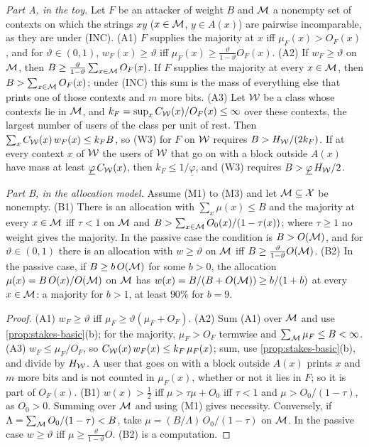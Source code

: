 \begin{theorem}\label{thm:lump}
\emph{Part A, in the toy.} Let $F$ be an attacker of weight $B$ and $\mathcal M$ a nonempty set of contexts on which
the strings $xy$ ($x\in\mathcal M$, $y\in A(x)$) are pairwise incomparable, as they are under (INC). \textup{(A1)}
$F$ supplies the majority at $x$ iff $\mu_F(x)>O_F(x)$, and for $\vartheta\in(0,1)$, $w_F(x)\ge\vartheta$ iff
$\mu_F(x)\ge\frac{\vartheta}{1-\vartheta}O_F(x)$. \textup{(A2)} If $w_F\ge\vartheta$ on $\mathcal M$, then
$B\ge\frac{\vartheta}{1-\vartheta}\sum_{x\in\mathcal M}O_F(x)$. If $F$ supplies the majority at every $x\in\mathcal M$, then
$B>\sum_{x\in\mathcal M}O_F(x)$; under (INC) this sum is the mass of everything else that prints one of those
contexts and $m$ more bits. \textup{(A3)} Let $\mathcal W$ be a class whose contexts lie in $\mathcal M$, and
$k_F=\sup_xC_{\mathcal W}(x)/O_F(x)\le\infty$ over these contexts, the largest number of users of the class per unit
of rest. Then $\sum_xC_{\mathcal W}(x)\,w_F(x)\le k_FB$, so (W3) for $F$ on $\mathcal W$ requires $B>H_{\mathcal W}/(2k_F)$. If at
every context $x$ of $\mathcal W$ the users of $\mathcal W$ that go on with a block outside $A(x)$ have mass at least
$\underline\varphi\,C_{\mathcal W}(x)$, then $k_F\le1/\underline\varphi$, and (W3) requires
$B>\underline\varphi\,H_{\mathcal W}/2$.

\emph{Part B, in the allocation model.} Assume (M1) to (M3) and let $\mathcal M\subseteq\mathcal X$ be nonempty.
\textup{(B1)} There is an allocation with $\sum_x\mu(x)\le B$ and the majority at every $x\in\mathcal M$ iff
$\tau<1$ on $\mathcal M$ and $B>\sum_{x\in\mathcal M}O_0(x)/(1-\tau(x))$; where $\tau\ge1$ no weight gives the majority.
In the passive case the condition is $B>O(\mathcal M)$, and for $\vartheta\in(0,1)$ there is an allocation with
$w\ge\vartheta$ on $\mathcal M$ iff $B\ge\frac{\vartheta}{1-\vartheta}O(\mathcal M)$. \textup{(B2)} In the passive case,
if $B\ge b\,O(\mathcal M)$ for some $b>0$, the allocation $\mu(x)=B\,O(x)/O(\mathcal M)$ on $\mathcal M$ has
$w(x)=B/(B+O(\mathcal M))\ge b/(1+b)$ at every $x\in\mathcal M$: a majority for $b>1$, at least $90\%$ for $b=9$.
\end{theorem}
\begin{proof}
(A1) $w_F\ge\vartheta$ iff $\mu_F\ge\vartheta(\mu_F+O_F)$. (A2) Sum (A1) over $\mathcal M$ and use
\cref{prop:stakes-basic}(b); for the majority, $\mu_F>O_F$ termwise and $\sum_{\mathcal M}\mu_F\le B<\infty$. (A3)
$w_F\le\mu_F/O_F$, so $C_{\mathcal W}(x)\,w_F(x)\le k_F\,\mu_F(x)$; sum, use \cref{prop:stakes-basic}(b), and divide
by $H_{\mathcal W}$. A user that goes on with a block outside $A(x)$ prints $x$ and $m$ more bits and is not counted
in $\mu_F(x)$, whether or not it lies in $F$; so it is part of $O_F(x)$. (B1) $w(x)>\frac12$ iff
$\mu>\tau\mu+O_0$ iff $\tau<1$ and $\mu>O_0/(1-\tau)$, as $O_0>0$. Summing over $\mathcal M$ and using (M1) gives
necessity. Conversely, if $\Lambda=\sum_{\mathcal M}O_0/(1-\tau)<B$, take $\mu=(B/\Lambda)\,O_0/(1-\tau)$ on $\mathcal M$.
In the passive case $w\ge\vartheta$ iff $\mu\ge\frac{\vartheta}{1-\vartheta}O$. (B2) is a computation.
\end{proof}


